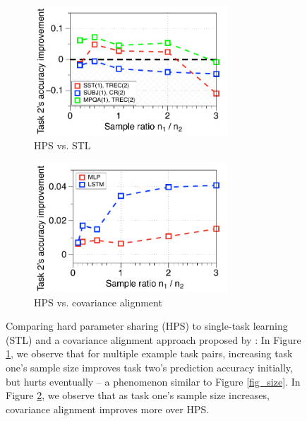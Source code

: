 \begin{figure}%
	\begin{subfigure}[t]{0.5\textwidth}
		\centering
		\vspace{0pt}
		\includegraphics[width=0.8\textwidth]{figures/fig3a.pdf}
		\caption{HPS vs. STL}
		\label{fig_ab_data}
	\end{subfigure}\hfill
	\begin{subfigure}[t]{0.5\textwidth}
		\centering
		\vspace{0pt}
		\includegraphics[width=0.8\textwidth]{figures/fig3b.pdf}
		\caption{HPS vs. covariance alignment}
		\label{fig_ab_cov}
	\end{subfigure}
	\caption{Comparing hard parameter sharing (HPS) to single-task learning (STL) and a covariance alignment approach proposed by \citet{WZR20}:
	In Figure \ref{fig_ab_data}, we observe that for multiple example task pairs, increasing task one's sample size improves task two's prediction accuracy initially, but hurts eventually -- a phenomenon similar  to Figure \ref{fig_size}.
	In Figure \ref{fig_ab_cov}, we observe that as task one's sample size increases, covariance alignment improves more over HPS.}
	\label{fig_text}

\end{figure}

